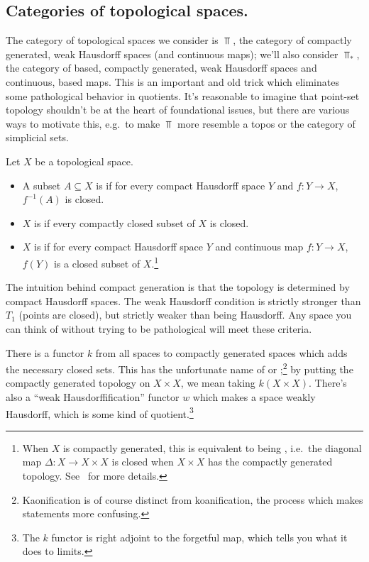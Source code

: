 \subsection*{Categories of topological spaces.}
The category of topological spaces we consider is $\Top$, the category of compactly generated, weak Hausdorff
spaces (and continuous maps); we'll also consider $\Top_*$, the category of based, compactly generated, weak
Hausdorff spaces and continuous, based maps. This is an important and old trick which eliminates some pathological
behavior in quotients. It's reasonable to imagine that point-set topology shouldn't be at the heart of foundational
issues, but there are various ways to motivate this, e.g.\ to make $\Top$ more resemble a topos or the category of
simplicial sets.
\begin{defn}
Let $X$ be a topological space.
\begin{itemize}
	\item A subset $A\subseteq X$ is  if for every compact Hausdorff space $Y$ and $f\colon
	Y\to X$, $f^{-1}(A)$ is closed.
	\item $X$ is  if every compactly closed subset
	of $X$ is closed.
	\item $X$ is  if for every compact Hausdorff space $Y$ and continuous map $f\colon Y\to
	X$, $f(Y)$ is a closed subset of $X$.\footnote{When $X$ is compactly generated, this is equivalent to being
	, i.e.\ the diagonal map $\Delta\colon X\to X\times X$ is closed
	when $X\times X$ has the compactly generated topology. See~\cite{StricklandCGWH, RezkCGWH} for more details.}
\end{itemize}
\end{defn}
The intuition behind compact generation is that the topology is determined by compact Hausdorff spaces. The weak
Hausdorff condition is strictly stronger than $T_1$ (points are closed), but strictly weaker than being Hausdorff.
Any space you can think of without trying to be pathological will meet these criteria.

There is a functor $k$ from all spaces to compactly generated spaces which adds the necessary closed sets. This has
the unfortunate name of  or
;\footnote{Kaonification is of course distinct from koanification, the
process which makes statements more confusing.} by putting the compactly generated topology on $X\times
X$, we mean taking $k(X\times X)$. There's also a ``weak Hausdorffification'' functor $w$ which makes a space weakly Hausdorff, which is some kind of quotient.\footnote{The $k$ functor
is right adjoint to the forgetful map, which tells you what it does to limits.}

